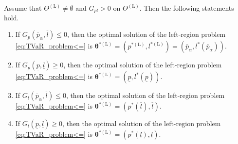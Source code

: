 \documentclass[a4paper,12pt]{article}
\begin{document}
\begin{proposition}\label{prop:tvar_first_result}
Assume that $\Theta^{\left(\text{L}\right)}\neq\emptyset$ and $G_{pl}>0$ on $\Theta^{\left(\text{L}\right)}$. Then the following statements hold.

\begin{enumerate}
\item[(i)] If $G_p\left(\overline{p}_{\alpha},\overline{l}\right)\leq 0$, then the optimal solution of the left-region problem \eqref{eq:TVaR_problem<=} is ${\bm\theta}^{*\left(\text{L}\right)}=\left(p^{*\left(\text{L}\right)},l^{*\left(\text{L}\right)}\right)=\left(\overline{p}_{\alpha},l^*\left(\overline{p}_{\alpha}\right)\right)$.

\item[(ii)] If $G_p\left(\underline{p},\underline{l}\right)\geq 0$, then the optimal solution of the left-region problem \eqref{eq:TVaR_problem<=} is ${\bm\theta}^{*\left(\text{L}\right)}=\left(\underline{p},l^*\left(\underline{p}\right)\right)$.

\item[(iii)] If $G_l\left(\overline{p}_{\alpha},\overline{l}\right)\leq 0$, then the optimal solution of the left-region problem \eqref{eq:TVaR_problem<=} is ${\bm\theta}^{*\left(\text{L}\right)}=\left(p^*\left(\overline{l}\right),\overline{l}\right)$.

\item[(iv)] If $G_l\left(\underline{p},\underline{l}\right)\geq 0$, then the optimal solution of the left-region problem \eqref{eq:TVaR_problem<=} is ${\bm\theta}^{*\left(\text{L}\right)}=\left(p^*\left(\underline{l}\right),\underline{l}\right)$.
\end{enumerate}
\end{proposition}
\end{document}
